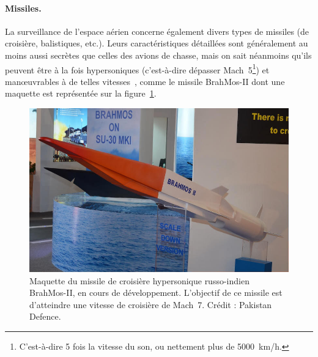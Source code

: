 	
	\paragraph{Missiles.}
	La surveillance de l'espace aérien concerne également divers types de missiles (de croisière, balistiques, etc.). Leurs caractéristiques détaillées sont généralement au moins aussi secrètes que celles des avions de chasse, mais on sait néanmoins qu'ils peuvent être à la fois hypersoniques (c'est-à-dire dépasser Mach~5\footnote{C'est-à-dire 5 fois la vitesse du son, ou nettement plus de 5000~km/h.}) et manœuvrables à de telles vitesses~\cite{missiles}, comme le missile BrahMos-II dont une maquette est représentée sur la figure~\ref{fig:brahmos}.
	
	\begin{figure}[htb]
		\centering
		\includegraphics[width=\textwidth]{figures/ch1/brahmos-II}
		\caption[Missile hypersonique BrahMos-II.]{Maquette du missile de croisière hypersonique russo-indien BrahMos-II, en cours de développement. L'objectif de ce missile est d'atteindre une vitesse de croisière de Mach~7\footnotemark. Crédit : Pakistan Defence\footnotemark.}
		\label{fig:brahmos}
	\end{figure}
	
	\addtocounter{footnote}{-1}
	\addtocounter{footnote}{1}
	
